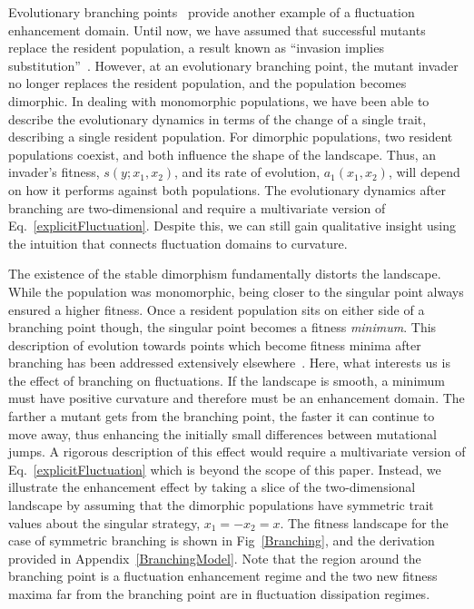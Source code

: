 Evolutionary branching points~\citep{dieckmann_nat1999, geritz_evoeco1998} provide another example of a fluctuation enhancement domain. Until now, we have assumed that successful mutants replace the resident population, a result known as ``invasion implies substitution''~\citep{geritz_jmb2002}. However, at an evolutionary branching point, the mutant invader no longer replaces the resident population, and the population becomes dimorphic.  In dealing with monomorphic populations, we have been able to describe the evolutionary dynamics in terms of the change of a single trait, describing a single resident population.  For dimorphic populations, two resident populations coexist, and both influence the shape of the landscape. Thus, an invader's fitness, $s(y;x_1,x_2)$, and its rate of evolution, $a_1(x_1,x_2)$, will depend on how it performs against both populations.  The evolutionary dynamics after branching are two-dimensional and require a multivariate version of Eq.~\eqref{explicitFluctuation}. Despite this, we can still gain qualitative insight using the intuition that connects fluctuation domains to curvature.

The existence of the stable dimorphism fundamentally distorts the landscape.  While the population was monomorphic, being closer to the singular point always ensured a higher fitness. Once a resident population sits on either side of a branching point though, the singular point becomes a fitness \emph{minimum}. This description of evolution towards points which become fitness minima after branching has been addressed extensively elsewhere~\citep{geritz_prl1997, geritz_evoeco1998, geritz_jmb2004}. Here, what interests us is the effect of branching on fluctuations. If the landscape is smooth, a minimum must have positive curvature and therefore must be an enhancement domain. The farther a mutant gets from the branching point, the faster it can continue to move away, thus enhancing the initially small differences between mutational jumps. A rigorous description of this effect would require a multivariate version of Eq.~\eqref{explicitFluctuation} which is beyond the scope of this paper.  Instead, we illustrate the enhancement effect by taking
a slice of the two-dimensional landscape by assuming that the dimorphic populations have symmetric trait values about the singular strategy, $x_1=-x_2=x$. The fitness landscape for the case of symmetric branching is shown in Fig~\ref{Branching}, and the derivation provided in Appendix~\ref{BranchingModel}. Note that the region around the branching point is a fluctuation enhancement regime and the two new fitness maxima far from the branching point are in fluctuation dissipation regimes.

